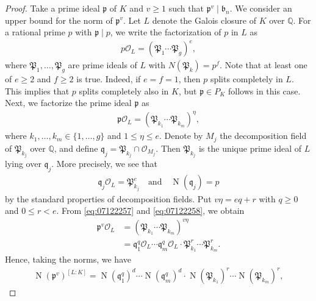 \documentclass[a4paper,11pt]{amsart}
\theoremstyle{definition}
\numberwithin{equation}{section}
\DeclareMathOperator{\norm}{N}
\begin{document}
\begin{proof}
Take a prime ideal $\mathfrak{p}$ of $K$ and $v \geq1$ such that $\mathfrak{p}^v \mid \mathfrak{b}_n$. 
We consider an upper bound for the norm of $\mathfrak{p}^v$. 
Let $L$ denote the Galois closure of $K$ over $\mathbb{Q}$. 
For a rational prime $p$ with $\mathfrak{p} \mid p$, we write the factorization of $p$ in $L$ as
\begin{align*}
p \mathcal{O}_L
= \left(\mathfrak{P}_1 \cdots \mathfrak{P}_g\right)^e, 
\end{align*}
where $\mathfrak{P}_1, \ldots, \mathfrak{P}_g$ are prime ideals of $L$ with $N(\mathfrak{P}_k)=p^f$. 
Note that at least one of $e \geq2$ and $f \geq2$ is true. 
Indeed, if $e=f=1$, then $p$ splits completely in $L$. 
This implies that $p$ splits completely also in $K$, but $\mathfrak{p} \in P_K$ follows in this case. 
Next, we factorize the prime ideal $\mathfrak{p}$ as 
\begin{align}\label{eq:07122257}
\mathfrak{p} \mathcal{O}_L
= \left(\mathfrak{P}_{k_1} \cdots \mathfrak{P}_{k_m}\right)^\eta, 
\end{align}
where $k_1, \ldots, k_m \in \{1, \ldots, g \}$ and $1 \leq \eta \leq e$. 
Denote by $M_j$ the decomposition field of $\mathfrak{P}_{k_j}$ over $\mathbb{Q}$, and define $\mathfrak{q}_j=\mathfrak{P}_{k_j} \cap \mathcal{O}_{M_j}$. 
Then $\mathfrak{P}_{k_j}$ is the unique prime ideal of $L$ lying over $\mathfrak{q}_j$. 
More precisely, we see that
\begin{align}\label{eq:07122258}
\mathfrak{q}_j \mathcal{O}_L
= \mathfrak{P}_{k_j}^e 
\quad\text{and}\quad
\norm(\mathfrak{q}_j)
= p
\end{align}
by the standard properties of decomposition fields. 
Put $v \eta= eq+r$ with $q \geq0$ and $0 \leq r <e$. 
From \eqref{eq:07122257} and \eqref{eq:07122258}, we obtain
\begin{align}\label{eq:07122339}
\mathfrak{p}^v \mathcal{O}_L
&= \left(\mathfrak{P}_{k_1} \cdots \mathfrak{P}_{k_m}\right)^{v\eta} \\
&= \mathfrak{q}_1^q \mathcal{O}_L \cdots \mathfrak{q}_m^q \mathcal{O}_L 
\cdot \mathfrak{P}_{k_1}^r \cdots \mathfrak{P}_{k_m}^r. \nonumber
\end{align}
Hence, taking the norms, we have
\begin{align}\label{eq:07130028}
\norm(\mathfrak{p}^v)^{[L:K]}
= \norm(\mathfrak{q}_1^q)^{d} \cdots \norm(\mathfrak{q}_m^q)^{d}
\cdot \norm(\mathfrak{P}_{k_1})^r \cdots \norm(\mathfrak{P}_{k_m})^r, 
\end{align}

\end{proof}
\end{document}
